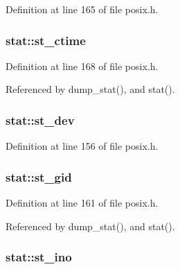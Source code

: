 Definition at line 165 of file posix.\-h.

\hypertarget{structstat_a1b4b858db1ebe79c3d6e0fc1ef721024}{
\subsubsection[{st\-\_\-ctime}]{ stat\-::st\-\_\-ctime}}\label{structstat_a1b4b858db1ebe79c3d6e0fc1ef721024}


Definition at line 168 of file posix.\-h.



Referenced by dump\-\_\-stat(), and stat().

\hypertarget{structstat_ac5b90090ae323741ae4c9e4f3683a29f}{
\subsubsection[{st\-\_\-dev}]{ stat\-::st\-\_\-dev}}\label{structstat_ac5b90090ae323741ae4c9e4f3683a29f}


Definition at line 156 of file posix.\-h.

\hypertarget{structstat_ab864f16f436cec370f0ced585d897698}{
\subsubsection[{st\-\_\-gid}]{ stat\-::st\-\_\-gid}}\label{structstat_ab864f16f436cec370f0ced585d897698}


Definition at line 161 of file posix.\-h.



Referenced by dump\-\_\-stat(), and stat().

\hypertarget{structstat_a9769ed8f0d4c5a9f329c32bc92479d56}{
\subsubsection[{st\-\_\-ino}]{ stat\-::st\-\_\-ino}}\label{structstat_a9769ed8f0d4c5a9f329c32bc92479d56}


